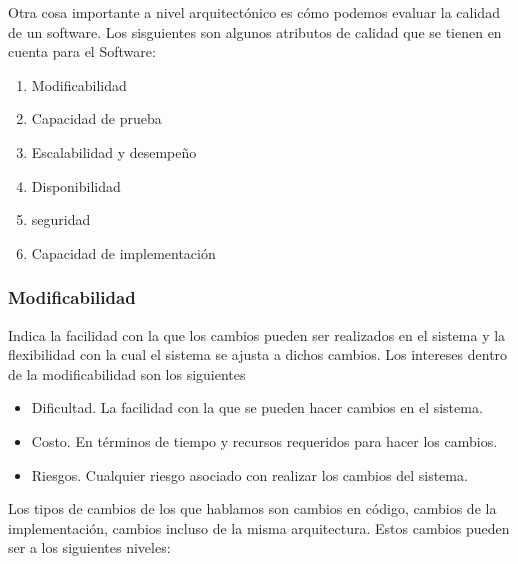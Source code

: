 Otra cosa importante a nivel arquitectónico es cómo podemos evaluar la calidad de un software. Los sisguientes son algunos atributos de calidad que se tienen en cuenta para el Software:

\begin{enumerate}
    \item Modificabilidad
    \item Capacidad de prueba
    \item Escalabilidad y desempeño
    \item Disponibilidad
    \item seguridad
    \item Capacidad de implementación
\end{enumerate}

\subsubsection{Modificabilidad}

Indica la facilidad con la que los cambios pueden ser realizados en el sistema y la flexibilidad con la cual el sistema se ajusta a dichos cambios. Los intereses dentro de la modificabilidad son los siguientes

\begin{itemize}
    \item Dificultad. La facilidad con la que se pueden hacer cambios en el sistema.
    \item Costo. En términos de tiempo y recursos requeridos para hacer los cambios.
    \item Riesgos. Cualquier riesgo asociado con realizar los cambios del sistema.
\end{itemize}

Los tipos de cambios de los que hablamos son cambios en código, cambios de la implementación, cambios incluso de la misma arquitectura. Estos cambios pueden ser a los siguientes niveles:

